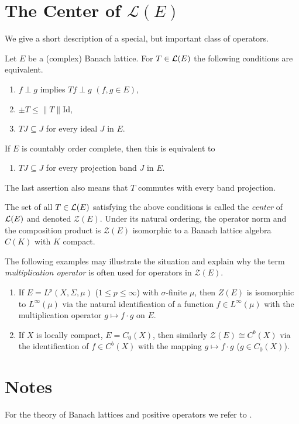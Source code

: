 \section{The Center of 
\texorpdfstring{$\mathcal{L}(E)$}{L(E)}}\label{sec:c1-9}
%
We give a short description of a special, but important class of operators.

Let $ E $ be a (complex) Banach lattice.
For $ T \in \mathcal{L}(E) $ the following conditions are equivalent.
\begin{enumerate}[\upshape (a)]

    \item 
    $ f \perp g $ implies $ Tf \perp g $ \quad $(f, g \in E)$,
    
    \item 
    $ \pm T \leq \|T\|\text{Id}$,
    
    \item 
    $ TJ \subseteq J $ for every ideal $ J $ in $ E $.
    
\end{enumerate}
If $ E $ is countably order complete, then this is equivalent to
\begin{enumerate}
    \item 
    $ TJ \subseteq J $ for every projection band $ J $ in $ E $.
\end{enumerate}
The last assertion also means that $ T $ commutes with every band projection.

The set of all $ T \in \mathcal{L}(E) $ satisfying the above conditions is called the \emph{center} of $ \mathcal{L}(E) $ and denoted 
$ \mathcal{Z}(E) $.
Under its natural ordering, the operator norm and the composition product is $ \mathcal{Z}(E) $ isomorphic to a Banach lattice algebra $ C(K) $ with $ K $ compact.

The following examples may illustrate the situation and explain why the term \emph{multiplication operator} is often used for operators in $ \mathcal{Z}(E) $.
\begin{enumerate}[\upshape (i), wide, labelindent=.5em]
\item 
If $ E = L^{p}(X,\Sigma,\mu) $ ($ 1 \leq p \leq \infty $) with $ \sigma $-finite $ \mu $, then $ Z(E) $ is isomorphic to $ L^{\infty}(\mu) $ via the natural identification of a function $ f \in L^{\infty}(\mu) $ with the multiplication operator $ g \mapsto f\cdot g $ on $ E $. 

\item 
If $ X $ is locally compact, $ E = C_{0}(X) $, then similarly $ \mathcal{Z}(E) \cong C^{b}(X) $ via the identification of $ f \in C^{b}(X) $ with the mapping $ g \mapsto f\cdot g $ ($ g \in C_{0}(X) $).
\end{enumerate}

\section*{Notes}

For the theory of Banach lattices and positive operators we refer to \citet{schaefer:1974}.

{\RaggedRight

}